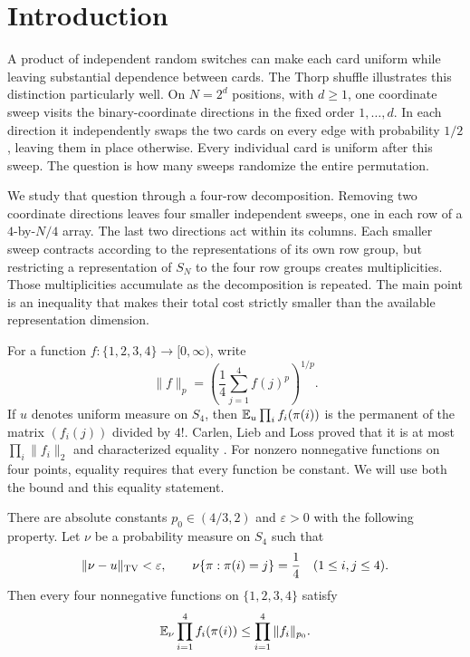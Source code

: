 \section{Introduction}
A product of independent random switches can make each card uniform while leaving substantial dependence between cards. The Thorp shuffle illustrates this distinction particularly well. On $N=2^d$ positions, with $d\ge1$, one coordinate sweep visits the binary-coordinate directions in the fixed order $1,\ldots,d$. In each direction it independently swaps the two cards on every edge with probability $1/2$, leaving them in place otherwise. Every individual card is uniform after this sweep. The question is how many sweeps randomize the entire permutation.

We study that question through a four-row decomposition. Removing two coordinate directions leaves four smaller independent sweeps, one in each row of a $4$-by-$N/4$ array. The last two directions act within its columns. Each smaller sweep contracts according to the representations of its own row group, but restricting a representation of $S_N$ to the four row groups creates multiplicities. Those multiplicities accumulate as the decomposition is repeated. The main point is an inequality that makes their total cost strictly smaller than the available representation dimension.

For a function $f:\{1,2,3,4\}\to[0,\infty)$, write
\[
 \|f\|_p=\left(\frac14\sum_{j=1}^4 f(j)^p\right)^{1/p}.
\]
If $u$ denotes uniform measure on $S_4$, then
$\mathbb E_u\prod_i f_i(\pi(i))$ is the permanent of the matrix $(f_i(j))$ divided by $4!$. Carlen, Lieb and Loss proved that it is at most $\prod_i\|f_i\|_2$ and characterized equality \cite[Theorem~1.1]{cll2006}. For nonzero nonnegative functions on four points, equality requires that every function be constant. We will use both the bound and this equality statement.

\begin{samepage}
\begin{theorem}
There are absolute constants $p_0\in(4/3,2)$ and $\varepsilon>0$ with the following property.\label{thm:permanent} Let $\nu$ be a probability measure on $S_4$ such that
\[
 \|\nu-u\|_{\operatorname{TV}}<\varepsilon,
 \qquad
 \nu\{\pi:\pi(i)=j\}=\frac14\quad(1\le i,j\le4).
\]
Then every four nonnegative functions on $\{1,2,3,4\}$ satisfy
\begin{equation}\label{eq:permanent}
 \mathbb E_\nu\prod_{i=1}^4f_i(\pi(i))\le\prod_{i=1}^4\|f_i\|_{p_0}.
\end{equation}
\end{theorem}
\end{samepage}

